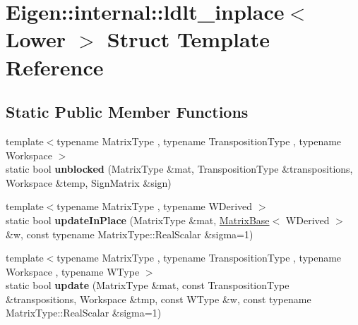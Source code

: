 \hypertarget{struct_eigen_1_1internal_1_1ldlt__inplace_3_01_lower_01_4}{}\section{Eigen\+:\+:internal\+:\+:ldlt\+\_\+inplace$<$ Lower $>$ Struct Template Reference}
\label{struct_eigen_1_1internal_1_1ldlt__inplace_3_01_lower_01_4}
\subsection*{Static Public Member Functions}
\begin{DoxyCompactItemize}
\item 
\mbox{\label{struct_eigen_1_1internal_1_1ldlt__inplace_3_01_lower_01_4_a6d8b99ce128d626854fff3517cf81e9c}} 
{\footnotesize template$<$typename Matrix\+Type , typename Transposition\+Type , typename Workspace $>$ }\\static bool {\bfseries unblocked} (Matrix\+Type \&mat, Transposition\+Type \&transpositions, Workspace \&temp, Sign\+Matrix \&sign)
\item 
\mbox{\label{struct_eigen_1_1internal_1_1ldlt__inplace_3_01_lower_01_4_a108b58e95ea9d74496b78803311769dd}} 
{\footnotesize template$<$typename Matrix\+Type , typename W\+Derived $>$ }\\static bool {\bfseries update\+In\+Place} (Matrix\+Type \&mat, \hyperlink{group___core___module_class_eigen_1_1_matrix_base}{Matrix\+Base}$<$ W\+Derived $>$ \&w, const typename Matrix\+Type\+::\+Real\+Scalar \&sigma=1)
\item 
\mbox{\label{struct_eigen_1_1internal_1_1ldlt__inplace_3_01_lower_01_4_ae45df1fbda86712753262a9200f8c97b}} 
{\footnotesize template$<$typename Matrix\+Type , typename Transposition\+Type , typename Workspace , typename W\+Type $>$ }\\static bool {\bfseries update} (Matrix\+Type \&mat, const Transposition\+Type \&transpositions, Workspace \&tmp, const W\+Type \&w, const typename Matrix\+Type\+::\+Real\+Scalar \&sigma=1)
\item 
\mbox{\label{struct_eigen_1_1internal_1_1ldlt__inplace_3_01_lower_01_4_a6d8b99ce128d626854fff3517cf81e9c}} 

\end{DoxyCompactItemize}
